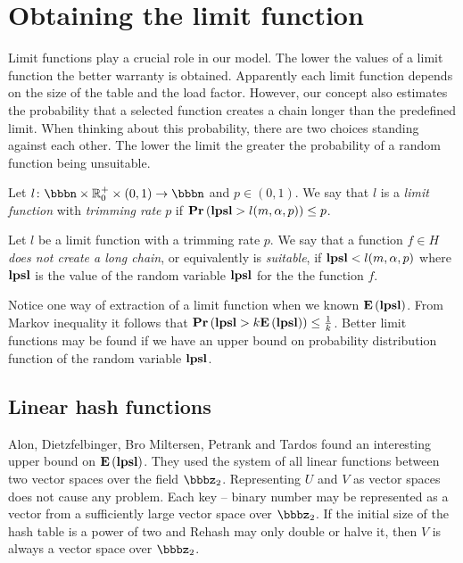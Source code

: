 \section{Obtaining the limit function}
\label{section-limit}
Limit functions play a crucial role in our model. The lower the values of a limit function the better warranty is obtained. Apparently each limit function depends on the size of the table and the load factor. However, our concept also estimates the probability that a selected function creates a chain longer than the predefined limit. When thinking about this probability, there are two choices standing against each other. The lower the limit the greater the probability of a random function being unsuitable.

\begin{definition}
Let $l\colon \bbbn \times \mathbb{R}_0^+ \times (0, 1) \rightarrow \bbbn$ and $p \in (0, 1)$.  We say that $l$ is a \emph{limit function} with \emph{trimming rate} $p$ if $\mathbf{Pr}\left(\mathbf{lpsl} > l(m, \alpha, p)\right) \leq p$.

Let $l$ be a limit function with a trimming rate $p$. We say that a function $f \in H$ \emph{does not create a long chain}, or equivalently is \emph{suitable}, if $\mathbf{lpsl} < l(m, \alpha, p)$ where $\mathbf{lpsl}$ is the value of the random variable $\mathbf{lpsl}$ for the the function $f$.
\end{definition}

Notice one way of extraction of a limit function when we known $\mathbf{E}\left(\mathbf{lpsl}\right)$. From Markov inequality it follows that $\mathbf{Pr}\left(\mathbf{lpsl} > k \mathbf{E}\left(\mathbf{lpsl}\right)\right) \leq \frac{1}{k}$. Better limit functions may be found if we have an upper bound on probability distribution function of the random variable $\mathbf{lpsl}$.

\subsection{Linear hash functions}
Alon, Dietzfelbinger, Bro Miltersen, Petrank and Tardos \cite{DBLP:journals/jacm/AlonDMPT99} found an interesting upper bound on $\mathbf{E}\left(\mathbf{lpsl}\right)$. They used the system of all linear functions between two vector spaces over the field $\bbbz_2$. Representing $U$ and $V$ as vector spaces does not cause any problem. Each key -- binary number may be represented as a vector from a sufficiently large vector space over $\bbbz_2$. If the initial size of the hash table is a power of two and Rehash may only double or halve it, then $V$ is always a vector space over $\bbbz_2$.

